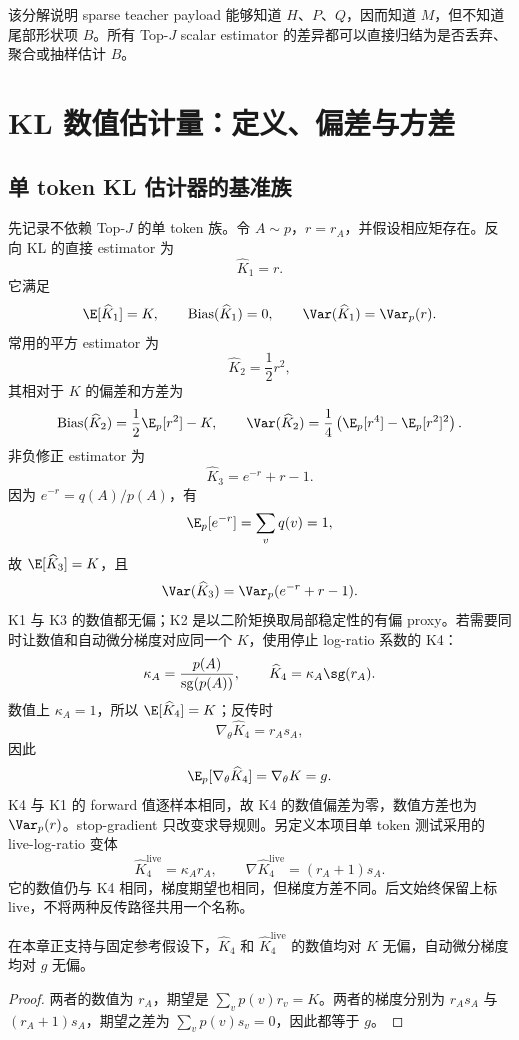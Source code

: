 该分解说明 sparse teacher payload 能够知道 $H$、$P$、$Q$，因而知道 $M$，但不知道尾部形状项 $B$。所有 Top-$J$ scalar estimator 的差异都可以直接归结为是否丢弃、聚合或抽样估计 $B$。

\section{KL 数值估计量：定义、偏差与方差}

\subsection{单 token KL 估计器的基准族}

先记录不依赖 Top-$J$ 的单 token 族。令 $A\sim p$，$r=r_A$，并假设相应矩存在。反向 KL 的直接 estimator 为
\[
 \widehat K_1=r.
\]
它满足
\[
 \E[\widehat K_1]=K,\qquad
 \operatorname{Bias}(\widehat K_1)=0,\qquad
 \Var(\widehat K_1)=\Var_p(r).
\]
常用的平方 estimator 为
\[
 \widehat K_2=\frac12r^2,
\]
其相对于 $K$ 的偏差和方差为
\begin{equation}
 \operatorname{Bias}(\widehat K_2)=\frac12\E_p[r^2]-K,
 \qquad
 \Var(\widehat K_2)=\frac14\left(\E_p[r^4]-\E_p[r^2]^2\right).
 \label{eq:chapter3-k2-bias-var}
\end{equation}
非负修正 estimator 为
\[
 \widehat K_3=e^{-r}+r-1.
\]
因为 $e^{-r}=q(A)/p(A)$，有
\[
 \E_p[e^{-r}]=\sum_vq(v)=1,
\]
故 $\E[\widehat K_3]=K$，且
\begin{equation}
 \Var(\widehat K_3)=\Var_p(e^{-r}+r-1).
 \label{eq:chapter3-k3-var}
\end{equation}
K1 与 K3 的数值都无偏；K2 是以二阶矩换取局部稳定性的有偏 proxy。若需要同时让数值和自动微分梯度对应同一个 $K$，使用停止 log-ratio 系数的 K4：
\[
 \kappa_A=\frac{p(A)}{\operatorname{sg}(p(A))},\qquad
 \widehat K_4=\kappa_A\sg(r_A).
\]
数值上 $\kappa_A=1$，所以 $\E[\widehat K_4]=K$；反传时
\[
 \nabla_\theta\widehat K_4=r_As_A,
\]
因此
\[
 \E_p[\nabla_\theta\widehat K_4]=\nabla_\theta K=g.
\]
K4 与 K1 的 forward 值逐样本相同，故 K4 的数值偏差为零，数值方差也为 $\Var_p(r)$。stop-gradient 只改变求导规则。另定义本项目单 token 测试采用的 live-log-ratio 变体
\[
 \widehat K_4^{\mathrm{live}}=\kappa_A r_A,\qquad
 \nabla\widehat K_4^{\mathrm{live}}=(r_A+1)s_A.
\]
它的数值仍与 K4 相同，梯度期望也相同，但梯度方差不同。后文始终保留上标 $\mathrm{live}$，不将两种反传路径共用一个名称。

\begin{theorem}[K4 的数值与梯度无偏性]
\label{thm:k4}
在本章正支持与固定参考假设下，$\widehat K_4$ 和 $\widehat K_4^{\mathrm{live}}$ 的数值均对 $K$ 无偏，自动微分梯度均对 $g$ 无偏。
\end{theorem}
\begin{proof}
两者的数值为 $r_A$，期望是 $\sum_vp(v)r_v=K$。两者的梯度分别为 $r_As_A$ 与 $(r_A+1)s_A$，期望之差为 $\sum_vp(v)s_v=0$，因此都等于 $g$。
\end{proof}

